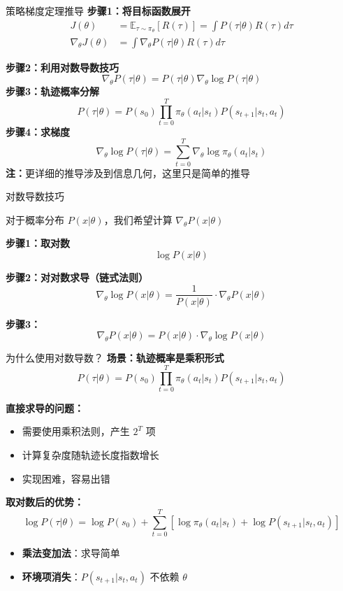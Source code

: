 \documentclass{beamer}
\begin{document}
\begin{frame}{策略梯度定理推导}
    \textbf{步骤1：将目标函数展开}
    \begin{align*}
    J(\theta) &= \mathbb{E}_{\tau \sim \pi_\theta} [R(\tau)] = \int P(\tau|\theta) R(\tau) d\tau \\
    \nabla_\theta J(\theta) &= \int \nabla_\theta P(\tau|\theta) R(\tau) d\tau
    \end{align*}
    
    \textbf{步骤2：利用对数导数技巧}
    \[ \nabla_\theta P(\tau|\theta) = P(\tau|\theta) \nabla_\theta \log P(\tau|\theta) \]
    \vspace{-0.2cm}
    \textbf{步骤3：轨迹概率分解}
    \vspace{-0.4cm}
    \[P(\tau|\theta) = P(s_0) \prod_{t=0}^{T} \pi_\theta(a_t|s_t) P(s_{t+1}|s_t, a_t) \]
    \vspace{-0.2cm}
    \textbf{步骤4：求梯度}
    \vspace{-0.2cm}
     \[ \nabla_\theta \log P(\tau|\theta) = \sum_{t=0}^{T} \nabla_\theta \log \pi_\theta(a_t|s_t) \]{\small \textbf{注：}更详细的推导涉及到信息几何，这里只是简单的推导}
    
\end{frame}

\begin{frame}{对数导数技巧}

        对于概率分布 $P(x|\theta)$，我们希望计算 $\nabla_\theta P(x|\theta)$
    
    \textbf{步骤1：取对数}
    \[
    \log P(x|\theta)
    \]
    
    \textbf{步骤2：对对数求导（链式法则）}
    \[
    \nabla_\theta \log P(x|\theta) = \frac{1}{P(x|\theta)} \cdot \nabla_\theta P(x|\theta)
    \]
    
    \textbf{步骤3：}
        \[
        \nabla_\theta P(x|\theta) = P(x|\theta) \cdot \nabla_\theta \log P(x|\theta)
        \]
\end{frame}

\begin{frame}{为什么使用对数导数？}
    \textbf{场景：轨迹概率是乘积形式}
    \[
    P(\tau|\theta) = P(s_0) \prod_{t=0}^{T} \pi_\theta(a_t|s_t) P(s_{t+1}|s_t, a_t)
    \]
    
    \textbf{直接求导的问题：}
    \begin{itemize}
        \item 需要使用乘积法则，产生 $2^T$ 项
        \item 计算复杂度随轨迹长度指数增长
        \item 实现困难，容易出错
    \end{itemize}
    
    \textbf{取对数后的优势：}
    \[
    \log P(\tau|\theta) = \log P(s_0) + \sum_{t=0}^{T} \left[ \log \pi_\theta(a_t|s_t) + \log P(s_{t+1}|s_t, a_t) \right]
    \]
    
    \begin{itemize}
        \item \textbf{乘法变加法}：求导简单
        \item \textbf{环境项消失}：$P(s_{t+1}|s_t, a_t)$ 不依赖 $\theta$
    \end{itemize}
\end{frame}
\end{document}
